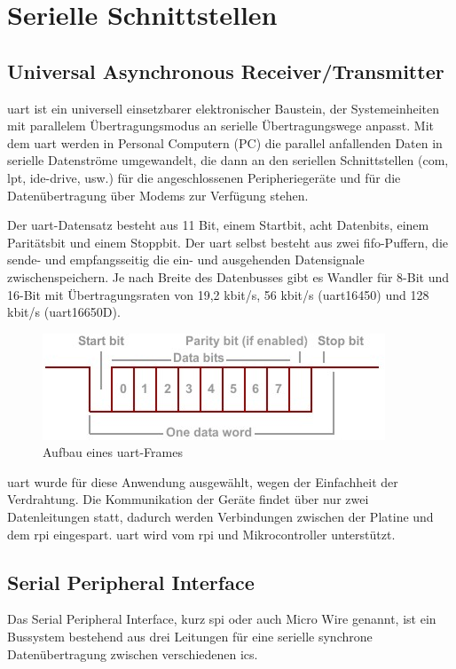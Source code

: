 \section{Serielle Schnittstellen}
\subsection{Universal Asynchronous Receiver/Transmitter}
\ac{uart} ist ein universell einsetzbarer elektronischer Baustein, der Systemeinheiten mit parallelem Übertragungsmodus an serielle Übertragungswege anpasst.
Mit dem \ac{uart} werden in Personal Computern (PC) die parallel anfallenden Daten in serielle Datenströme umgewandelt, die dann an den seriellen Schnittstellen (\acs{com}, \acs{lpt}, \acs{ide-drive}, usw.) für die angeschlossenen Peripheriegeräte und für die Datenübertragung über Modems zur Verfügung stehen. \cite{itwissen-uart}\par

Der \ac{uart}-Datensatz besteht aus 11 Bit, einem Startbit, acht Datenbits, einem Paritätsbit und einem Stoppbit.
Der \ac{uart} selbst besteht aus zwei \ac{fifo}-Puffern, die sende- und empfangsseitig die ein- und ausgehenden Datensignale zwischenspeichern.
Je nach Breite des Datenbusses gibt es Wandler für 8-Bit und 16-Bit mit Übertragungsraten von 19,2 kbit/s, 56 kbit/s (\ac{uart}16450) und 128 kbit/s (\ac{uart}16650D). \cite{itwissen-uart}\par
\begin{figure}[htbp!]
	\centering
	\includegraphics[width=.9\linewidth]{images/technische_grundlagen/tide_uart_data.png}
	\caption{Aufbau eines \ac{uart}-Frames \cite{tibbo-uart}}
\end{figure}

\ac{uart} wurde für diese Anwendung ausgewählt, wegen der Einfachheit der Verdrahtung.
Die Kommunikation der Geräte findet über nur zwei Datenleitungen statt, dadurch werden Verbindungen zwischen der Platine und dem \ac{rpi} eingespart.
\ac{uart} wird vom \ac{rpi} und Mikrocontroller unterstützt.


\subsection{Serial Peripheral Interface}
Das Serial Peripheral Interface, kurz \ac{spi} oder auch Micro Wire genannt, ist ein Bussystem bestehend aus drei Leitungen für eine serielle synchrone Datenübertragung zwischen verschiedenen \acp{ic}. \cite{mikrocontroller-spi}\par

